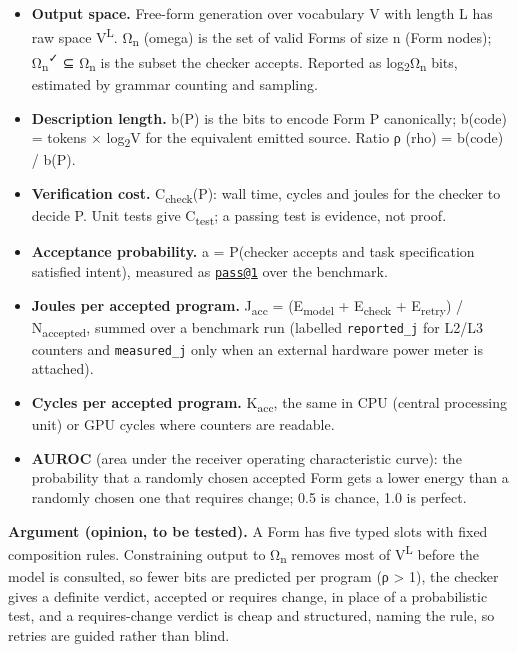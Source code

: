 \documentclass[10pt,letterpaper]{article}
\providecommand{\tightlist}{\setlength{\itemsep}{1pt}\setlength{\parskip}{0pt}}
\begin{document}
\begin{itemize}
\tightlist
\item
  \textbf{Output space.} Free-form generation over vocabulary V with
  length L has raw space \textbar V\textbar{}\textsuperscript{L}.
  Ω\textsubscript{n} (omega) is the set of valid Forms of size n (Form
  nodes); Ω\textsubscript{n}\textsuperscript{✓} ⊆ Ω\textsubscript{n} is
  the subset the checker accepts. Reported as
  log\textsubscript{2}\textbar Ω\textsubscript{n}\textbar{} bits,
  estimated by grammar counting and sampling.
\item
  \textbf{Description length.} b(P) is the bits to encode Form P
  canonically; b(code) = tokens ×
  log\textsubscript{2}\textbar V\textbar{} for the equivalent emitted
  source. Ratio ρ (rho) = b(code) / b(P).
\item
  \textbf{Verification cost.} C\textsubscript{check}(P): wall time,
  cycles and joules for the checker to decide P. Unit tests give
  C\textsubscript{test}; a passing test is evidence, not proof.
\item
  \textbf{Acceptance probability.} a = P(checker accepts and task
  specification satisfied \textbar{} intent), measured as
  \href{mailto:pass@1}{\nolinkurl{pass@1}} over the benchmark.
\item
  \textbf{Joules per accepted program.} J\textsubscript{acc} =
  (E\textsubscript{model} + E\textsubscript{check} +
  E\textsubscript{retry}) / N\textsubscript{accepted}, summed over a
  benchmark run (labelled \texttt{reported\_\allowbreak{}j} for L2/L3 counters and
  \texttt{measured\_\allowbreak{}j} only when an external hardware power meter is
  attached).
\item
  \textbf{Cycles per accepted program.} K\textsubscript{acc}, the same
  in CPU (central processing unit) or GPU cycles where counters are
  readable.
\item
  \textbf{AUROC} (area under the receiver operating characteristic
  curve): the probability that a randomly chosen accepted Form gets a
  lower energy than a randomly chosen one that requires change; 0.5 is
  chance, 1.0 is perfect.
\end{itemize}

\textbf{Argument (opinion, to be tested).} A Form has five typed slots
with fixed composition rules. Constraining output to Ω\textsubscript{n}
removes most of \textbar V\textbar{}\textsuperscript{L} before the model
is consulted, so fewer bits are predicted per program (ρ \textgreater{}
1), the checker gives a definite verdict, accepted or requires change,
in place of a probabilistic test, and a requires-change verdict is cheap
and structured, naming the rule, so retries are guided rather than
blind.
\end{document}
